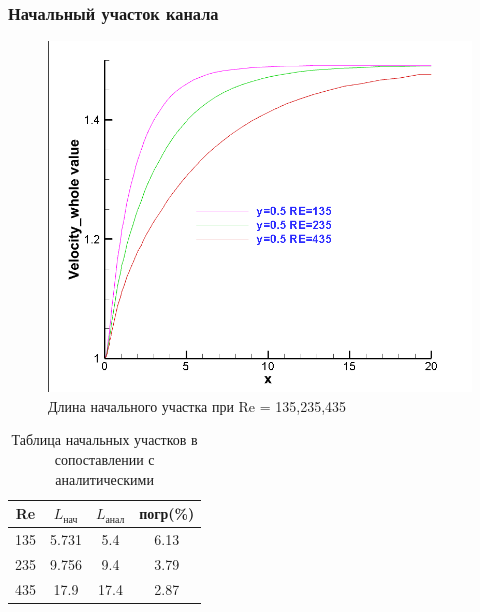 \documentclass[12pt, a4paper]{article}
\begin{document}
\subsubsection{Начальный участок канала}

\begin{figure}[H]
    \centering
    \includegraphics[scale = 0.6]{figure/y=0.5_RE=all.png}
    \caption{Длина начального участка при Re = 135,235,435}
    \label{pic5}
\end{figure}


\begin{table}[H]
    \centering
    \begin{tabular}{|c|c|c|c|}
    \hline
        Re  &  $L_{\text{нач}}$  &  $L_{\text{анал}}$  &  погр(\%) \\
    \hline
        135  &  5.731  &  5.4  &  6.13\\
    \hline
        235	 &  9.756  &  9.4  &  3.79\\
    \hline
        435  &  17.9  &  17.4  &  2.87\\
    \hline
    \end{tabular}
    \caption{Таблица начальных участков в сопоставлении с аналитическими}
    \label{Tab1}
\end{table}
\end{document}
